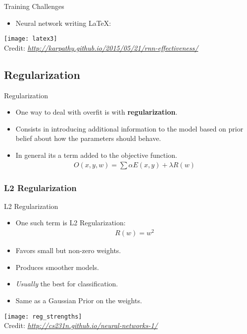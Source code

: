 \begin{frame}{Training Challenges}
	\begin{itemize}
		\item Neural network writing \LaTeX:
	\end{itemize}
	\begin{center}
		\texttt{[image: latex3]}\\[-1ex]
		{\tiny Credit: {\itshape \url{http://karpathy.github.io/2015/05/21/rnn-effectiveness/}}}
		\end{center}
\end{frame}

\subsection{Regularization}
\begin{frame}{Regularization}
	\begin{itemize}
		\item One way to deal with overfit is with \textbf{regularization}.
		\item Consists in introducing additional information to the model based on prior belief about how the parameters should behave.
		\item In general its a term added to the objective function.
		\begin{gather*}
			O(x,y,w) = \sum \alpha E(x,y) + \lambda R(w)
		\end{gather*}
	\end{itemize}
\end{frame}

\subsubsection{L2 Regularization}
\begin{frame}{L2 Regularization}
	\begin{itemize}
		\item One such term is L2 Regularization:
		\begin{gather*}
			R(w) = w^2
		\end{gather*}
		\item Favors small but non-zero weights.
		\item Produces smoother models.
		\item \textit{Usually} the best for classification.
		\item Same as a Gaussian Prior on the weights.
	\end{itemize}
	\begin{center}
		\texttt{[image: reg\_strengths]}\\[-1ex]
		{\tiny Credit: {\itshape \url{http://cs231n.github.io/neural-networks-1/}}}
		\end{center}
\end{frame}

